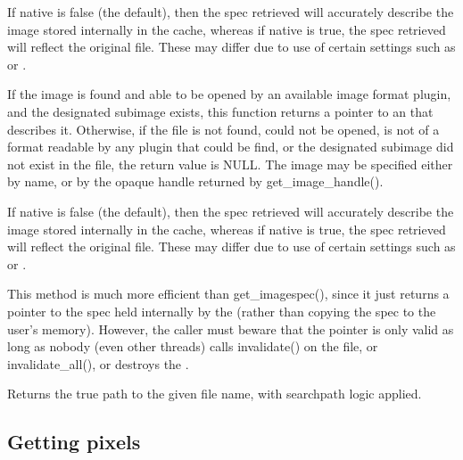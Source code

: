 If {\cf native} is {\cf false} (the default), then the spec retrieved
will accurately describe the image stored internally in the cache,
whereas if {\cf native} is {\cf true}, the spec retrieved will reflect
the original file.  These may differ due to use of certain \ImageCache
settings such as  or .

\apiend


If the image is found and able to be opened by an available
image format plugin, and the designated subimage exists, this function
returns a pointer to an \ImageSpec that describes it.  Otherwise, if the
file is not found, could not be opened, is not of a format readable by
any plugin that could be find, or the designated subimage did
not exist in the file, the return value is NULL.
The image may be specified either by name, or by the opaque handle returned
by {\cf get_image_handle()}.

If {\cf native} is {\cf false} (the default), then the spec retrieved
will accurately describe the image stored internally in the cache,
whereas if {\cf native} is {\cf true}, the spec retrieved will reflect
the original file.  These may differ due to use of certain \ImageCache
settings such as  or .

This method is much more efficient than {\cf get_imagespec()}, since it
just returns a pointer to the spec held internally by the \ImageCache
(rather than copying the spec to the user's memory).  However, the
caller must beware that the pointer is only valid as long as nobody
(even other threads) calls {\cf invalidate()} on the file, or {\cf
  invalidate_all()}, or destroys the \ImageCache.
\apiend

Returns the true path to the given file name, with searchpath logic
applied.
\apiend

\subsection{Getting pixels}
\label{sec:imagecache:api:getpixels}

